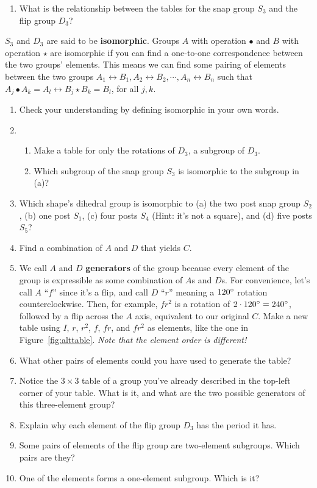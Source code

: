 \documentclass[../gatm.tex]{subfiles}
\begin{document}
%
\begin{enumerate}
\setcounter{enumi}{\theenumLast}
\item What is the relationship between the tables for the snap group $S_3$ and the flip group $D_3$?
\setcounter{enumLast}{\theenumi}
\end{enumerate}
$S_3$ and $D_3$ are said to be \textbf{isomorphic}. Groups $A$ with operation $\bullet$ and $B$ with operation $\star$ are isomorphic if you can find a one-to-one correspondence between the two groups' elements. This means we can find some pairing of elements between the two groups $A_1\leftrightarrow B_1, A_2\leftrightarrow B_2, \cdots, A_n \leftrightarrow B_n$ such that $A_j \bullet A_k = A_l \leftrightarrow B_j \star B_k = B_l$, for all $j,k$.
\begin{enumerate}
\setcounter{enumi}{\theenumLast}
\item Check your understanding by defining isomorphic in your own words.
\item \begin{enumerate}
\item Make a table for only the rotations of $D_3$, a subgroup of $D_3$.
\item Which subgroup of the snap group $S_3$ is isomorphic to the subgroup in (a)?
\end{enumerate}
\item Which shape's dihedral group is isomorphic to (a) the two post snap group $S_2$, (b) one post $S_1$, (c) four posts $S_4$ (Hint: it's not a square), and (d) five posts $S_5$?
\item Find a combination of $A$ and $D$ that yields $C$.
\item We call $A$ and $D$ \textbf{generators} of the group because every element of the group is expressible as some combination of $A$s and $D$s. For convenience, let's call $A$ ``$f$'' since it's a flip, and call $D$ ``$r$'' meaning a $120^\circ$ rotation counterclockwise. Then, for example, $fr^2$ is a rotation of $2\cdot 120^\circ = 240^\circ$, followed by a flip across the $A$ axis, equivalent to our original $C$. Make a new table using $I$, $r$, $r^2$, $f$, $fr$, and $fr^2$ as elements, like the one in Figure~\ref{fig:alttable}. \textit{Note that the element order is different!}
\item What other pairs of elements could you have used to generate the table?
\item Notice the $3\times 3$ table of a group you've already described in the top-left corner of your table. What is it, and what are the two possible generators of this three-element group?
\item Explain why each element of the flip group $D_3$ has the period it has.
\item Some pairs of elements of the flip group are two-element subgroups. Which pairs are they?
\item One of the elements forms a one-element subgroup. Which is it?
\setcounter{enumLast}{\theenumi}
\end{enumerate}
\end{document}
